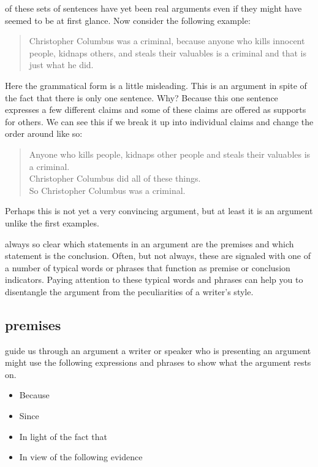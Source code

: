 \documentclass[justified]{tufte-book}
\providecommand{\tightlist}{%
  \setlength{\itemsep}{0pt}\setlength{\parskip}{0pt}}
\newenvironment{argument}{\begin{quote}\normalsize}{\end{quote}}
\begin{document}
 of these sets of sentences have yet been real arguments even if they might have seemed to be at first glance. Now consider the following example:

\begin{argument}
Christopher Columbus was a criminal, because anyone who kills innocent
people, kidnaps others, and steals their valuables is a criminal and
that is just what he did.
\end{argument}

Here the grammatical form is a little misleading. This is an argument in spite of the fact that there is only one sentence. Why? Because this one sentence expresses a few different claims and some of these claims are offered as supports for others. We can see this if we break it up into individual claims and change the order around like so:

\begin{argument}
Anyone who kills people, kidnaps other people and steals their valuables
is a criminal.\\
Christopher Columbus did all of these things.\\

So Christopher Columbus was a criminal.
\end{argument}

Perhaps this is not yet a very convincing argument, but at least it is an argument unlike the first examples.

 always so clear which statements in an argument are the premises and which statement is the conclusion. Often, but not always, these are signaled with one of a number of typical words or phrases that function as premise or conclusion indicators. Paying attention to these typical words and phrases can help you to disentangle the argument from the peculiarities of a writer's style.

\hypertarget{premises}{%
\subsection*{premises}\label{premises}}

 guide us through an argument a writer or speaker who is presenting an argument might use the following expressions and phrases to show what the argument rests on.

\begin{itemize}
\tightlist
\item
  Because
\item
  Since
\item
  In light of the fact that
\item
  In view of the following evidence
\end{itemize}
\end{document}
